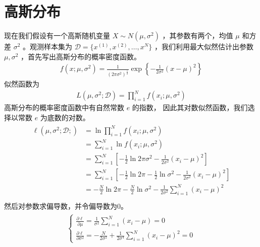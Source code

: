 \documentclass[letterpaper,10pt,english]{sphinxmanual}
\begin{document}
\section{高斯分布}
\label{\detokenize{_u6700_u5927_u4f3c_u7136_u4f30_u8ba1/content:ch-2-gaussian-ml}}\label{\detokenize{_u6700_u5927_u4f3c_u7136_u4f30_u8ba1/content:id5}}
现在我们假设有一个高斯随机变量 \(X \sim N(\mu,\sigma^2)\) ，其参数有两个，均值 \(\mu\)
和方差 \(\sigma^2\) 。观测样本集为 \(\mathcal{D}=\{x^{(1)},x^{(2)},\ldots,x^{N}\}\)
，我们利用最大似然估计出参数 \(\mu,\sigma^2\) ，首先写出高斯分布的概率密度函数。
\begin{equation}\label{equation:最大似然估计/content:最大似然估计/content:17}
\begin{split}f(x;\mu,\sigma^2) = \frac{1}{ (2\pi \sigma^2)^{\frac{1}{2}} } \exp \left \{ - \frac{1}{2\sigma^2} (x-\mu)^2 \right \}\end{split}
\end{equation}
似然函数为
\begin{equation}\label{equation:最大似然估计/content:最大似然估计/content:18}
\begin{split}L(\mu,\sigma^2;\mathcal{D}) = \prod_{i=1}^N f(x_i;\mu,\sigma^2)\end{split}
\end{equation}
高斯分布的概率密度函数中有自然常数 \(e\) 的指数，
因此其对数似然函数，我们选择以常数 \(e\) 为底数的对数。
\begin{align}\label{equation:最大似然估计/content:最大似然估计/content:19}\!\begin{aligned}
\ell (\mu,\sigma^2;\mathcal{D};) &= \ln \prod_{i=1}^N f(x_i;\mu,\sigma^2)\\
&= \sum_{i=1}^N \ln f(x_i;\mu,\sigma^2)\\
&= \sum_{i=1}^N \left [ -\frac{1}{2} \ln 2 \pi \sigma^2    - \frac{1}{2\sigma^2} (x_i-\mu)^2 \right ]\\
&= \sum_{i=1}^N \left [ -\frac{1}{2} \ln 2 \pi    -\frac{1}{2} \ln \sigma^2    - \frac{1}{2\sigma^2} (x_i-\mu)^2 \right ]\\
&=  -\frac{N}{2} \ln 2 \pi    -\frac{N}{2} \ln \sigma^2    -  \frac{1}{2\sigma^2} \sum_{i=1}^N (x_i-\mu)^2\\
\end{aligned}\end{align}
然后对参数求偏导数，并令偏导数为0。
\begin{align}\label{equation:最大似然估计/content:最大似然估计/content:20}\!\begin{aligned}
\begin{cases}
\frac{\partial \ell}{\partial \mu} = \frac{1}{\sigma^2} \sum_{i=1}^N (x_i-\mu) = 0\\
\frac{\partial \ell}{\partial \sigma^2}= -\frac{N}{2\sigma^2} + \frac{1}{2\sigma^4} \sum_{i=1}^N (x_i-\mu)^2=0
\end{cases}\\
\end{aligned}\end{align}
\end{document}

